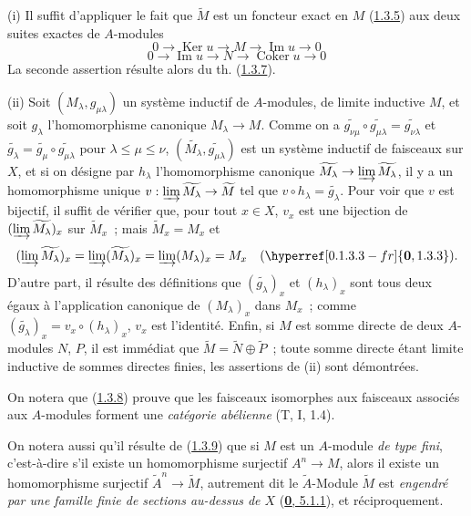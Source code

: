 (i) Il suffit d'appliquer le fait que $\widetilde{M}$ est un foncteur exact en
$M$ (\hyperref[I.1.3.5-fr]{1.3.5}) aux deux suites exactes de $A$-modules
\[
  0\to\operatorname{Ker}u\to M\to\operatorname{Im}u\to0
\]
\[
  0\to\operatorname{Im}u\to N\to\operatorname{Coker}u\to0
\]
La seconde assertion résulte alors du th.
(\hyperref[I.1.3.7-fr]{1.3.7}).

(ii) Soit $(M_\lambda,g_{\mu\lambda})$ un système inductif de $A$-modules, de
limite inductive $M$, et soit $g_\lambda$ l'homomorphisme canonique
$M_\lambda\to M$. Comme on a
$\widetilde{g_{\nu\mu}}\circ\widetilde{g_{\mu\lambda}}
=\widetilde{g_{\nu\lambda}}$ et
$\widetilde{g_\lambda}=\widetilde{g_\mu}\circ
\widetilde{g_{\mu\lambda}}$ pour $\lambda\leq\mu\leq\nu$,
$(\widetilde{M_\lambda},\widetilde{g_{\mu\lambda}})$ est un système
inductif de faisceaux sur $X$, et si on désigne par $h_\lambda$
l'homomorphisme canonique
$\widetilde{M_\lambda}\to\varinjlim\widetilde{M_\lambda}$, il y a un
homomorphisme unique
$v:\varinjlim\widetilde{M_\lambda}\to\widetilde{M}$ tel que
$v\circ h_\lambda=\widetilde{g_\lambda}$. Pour voir que $v$ est bijectif, il
suffit de vérifier que, pour tout $x\in X$, $v_x$ est une bijection de
$(\varinjlim\widetilde{M_\lambda})_x$ sur $\widetilde{M}_x$~; mais
$\widetilde{M}_x=M_x$ et
\[
  (\varinjlim\widetilde{M_\lambda})_x
  =\varinjlim(\widetilde{M_\lambda})_x
  =\varinjlim(M_\lambda)_x=M_x
  \quad(\hyperref[0.1.3.3-fr]{\textbf{0}, 1.3.3}).
\]
D'autre part, il résulte des définitions que $(\widetilde{g_\lambda})_x$ et
$(h_\lambda)_x$ sont tous deux égaux à l'application canonique de
$(M_\lambda)_x$ dans $M_x$~; comme
$(\widetilde{g_\lambda})_x=v_x\circ(h_\lambda)_x$, $v_x$ est l'identité.
Enfin, si $M$ est somme directe de deux $A$-modules $N$, $P$, il est immédiat
que $\widetilde{M}=\widetilde{N}\oplus\widetilde{P}$~; toute somme directe
étant limite inductive de sommes directes finies, les assertions de (ii) sont
démontrées.

On notera que (\hyperref[I.1.3.8-fr]{1.3.8}) prouve que les faisceaux
isomorphes aux faisceaux associés aux $A$-modules forment une
\emph{catégorie abélienne} (T, I, 1.4).

On notera aussi qu'il résulte de (\hyperref[I.1.3.9-fr]{1.3.9}) que si $M$ est
un $A$-module \emph{de type fini}, c'est-à-dire s'il existe un homomorphisme
surjectif $A^n\to M$, alors il existe un homomorphisme surjectif
$\widetilde{A}^n\to\widetilde{M}$, autrement dit le $\widetilde{A}$-Module
$\widetilde{M}$ est \emph{engendré par une famille finie de sections au-dessus
de $X$} (\hyperref[0.5.1.1-fr]{\textbf{0}, 5.1.1}), et réciproquement.

